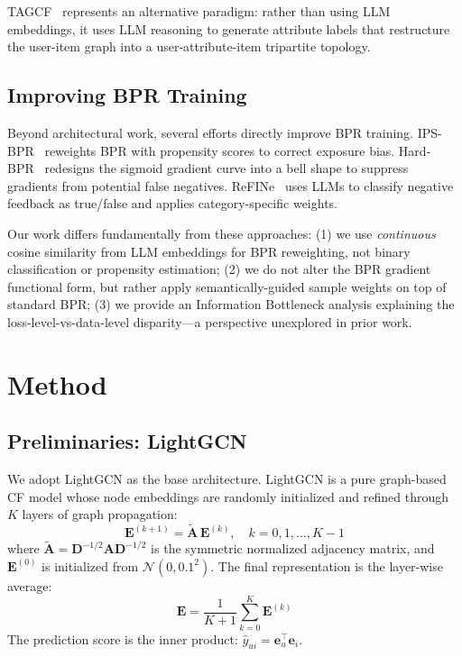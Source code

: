 \documentclass[11pt,a4paper]{article}
\begin{document}
TAGCF~\cite{Meng2026TAGCF} represents an alternative paradigm: rather than using LLM embeddings, it uses LLM reasoning to generate attribute labels that restructure the user-item graph into a user-attribute-item tripartite topology.

\subsection{Improving BPR Training}

Beyond architectural work, several efforts directly improve BPR training. IPS-BPR~\cite{Raja2025IPS} reweights BPR with propensity scores to correct exposure bias. Hard-BPR~\cite{Shi2024HardBPR} redesigns the sigmoid gradient curve into a bell shape to suppress gradients from potential false negatives. ReFINe~\cite{Jeong2025ReFINe} uses LLMs to classify negative feedback as true/false and applies category-specific weights.

Our work differs fundamentally from these approaches: (1) we use \emph{continuous} cosine similarity from LLM embeddings for BPR reweighting, not binary classification or propensity estimation; (2) we do not alter the BPR gradient functional form, but rather apply semantically-guided sample weights on top of standard BPR; (3) we provide an Information Bottleneck analysis explaining the loss-level-vs-data-level disparity---a perspective unexplored in prior work.

\section{Method}

\subsection{Preliminaries: LightGCN}

We adopt LightGCN as the base architecture. LightGCN is a pure graph-based CF model whose node embeddings are randomly initialized and refined through $K$ layers of graph propagation:
\begin{equation}
    \mathbf{E}^{(k+1)} = \tilde{\mathbf{A}} \, \mathbf{E}^{(k)}, \quad k = 0,1,\dots,K-1
\end{equation}
where $\tilde{\mathbf{A}} = \mathbf{D}^{-1/2}\mathbf{A}\mathbf{D}^{-1/2}$ is the symmetric normalized adjacency matrix, and $\mathbf{E}^{(0)}$ is initialized from $\mathcal{N}(0, 0.1^2)$. The final representation is the layer-wise average:
\begin{equation}
    \mathbf{E} = \frac{1}{K+1} \sum_{k=0}^{K} \mathbf{E}^{(k)}
\end{equation}
The prediction score is the inner product: $\hat{y}_{ui} = \mathbf{e}_u^{\top} \mathbf{e}_i$.
\end{document}
